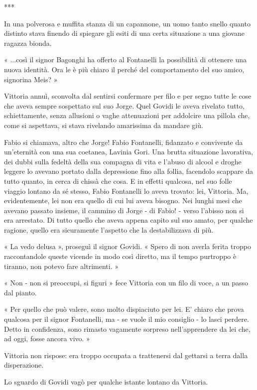 ***

In una polverosa e muffita stanza di un capannone, un uomo tanto snello quanto distinto stava finendo di spiegare gli esiti di una certa situazione a una giovane ragazza bionda.

« ...così il signor Bagonghi ha offerto al Fontanelli la possibilità di ottenere una nuova identità. Ora le è più chiaro il perché del comportamento del suo amico, signorina Meis? »

Vittoria annuì, sconvolta dal sentirsi confermare per filo e per segno tutte le cose che aveva sempre sospettato sul suo Jorge. Quel Govidi le aveva rivelato tutto, schiettamente, senza allusioni o vaghe attenuazioni per addolcire una pillola che, come si aspettava, si stava rivelando amarissima da mandare giù.

Fabio si chiamava, altro che Jorge! Fabio Fontanelli, fidanzato e convivente da un'eternità con una sua coetanea, Lavinia Gori. Una brutta situazione lavorativa, dei dubbi sulla fedeltà della sua compagna di vita e l'abuso di alcool e droghe leggere lo avevano portato dalla depressione fino alla follia, facendolo scappare da tutto quanto, in cerca di chissà che cosa. E in effetti qualcosa, nel suo folle viaggio lontano da sé stesso, Fabio Fontanelli lo aveva trovato: lei, Vittoria. Ma, evidentemente, lei non era quello di cui lui aveva bisogno. Nei lunghi mesi che avevano passato insieme, il cammino di Jorge - di Fabio! - verso l'abisso non si era arrestato. Di tutto quello che aveva appena capito sul suo amato, per qualche ragione, quello era sicuramente l'aspetto che la destabilizzava di più.

« La vedo delusa », proseguì il signor Govidi. « Spero di non averla ferita troppo raccontandole queste vicende in modo così diretto, ma il tempo purtroppo è tiranno, non potevo fare altrimenti. »

« Non - non si preoccupi, si figuri » fece Vittoria con un filo di voce, a un passo dal pianto.

« Per quello che può valere, sono molto dispiaciuto per lei. E' chiaro che prova qualcosa per il signor Fontanelli, ma - se vuole il mio consiglio - lo lasci perdere. Detto in confidenza, sono rimasto vagamente sorpreso nell'apprendere da lei che, ad oggi, fosse ancora vivo. »

Vittoria non rispose: era troppo occupata a trattenersi dal gettarsi a terra dalla disperazione.

Lo sguardo di Govidi vagò per qualche istante lontano da Vittoria.

